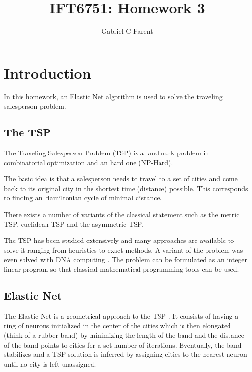 \documentclass{article} %
\author{
Gabriel C-Parent\\
}
\begin{document}
\title{IFT6751: Homework 3}
      
\maketitle
\section{Introduction}

In this homework, an Elastic Net algorithm is used to solve the traveling salesperson problem.

\subsection{The TSP}

The Traveling Salesperson Problem (TSP) is a landmark problem in combinatorial optimization and an hard one (NP-Hard)\citep{euc_tsp_complete}.\newline

The basic idea is that a salesperson needs to travel to a set of cities and come back to its original city in the shortest time (distance) possible. This corresponds to finding an Hamiltonian cycle of minimal distance.\newline

There exists a number of variants of the classical statement such as the metric TSP, euclidean TSP and the asymmetric TSP.\newline

The TSP has been studied extensively and many approaches are available to solve it ranging from heuristics to exact methods. A variant of the problem was even solved with DNA computing \citep{adleman}. The problem can be formulated as an integer linear program so that classical mathematical programming tools can be used.


\subsection{Elastic Net}

The Elastic Net is a geometrical approach to the TSP \citep{en_original}. It consists of having a ring of neurons initialized in the center of the cities which is then elongated (think of a rubber band) by minimizing the length of the band and the distance of the band points to cities for a set number of iterations. Eventually, the band stabilizes and a TSP solution is inferred by assigning cities to the nearest neuron until no city is left unassigned.\newline
\end{document}
